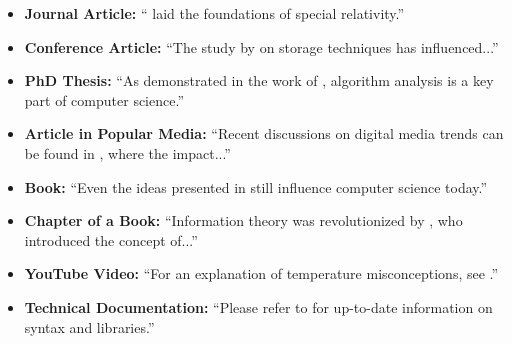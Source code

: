 \documentclass[10pt,twocolumn]{article}
\begin{document}
\begin{itemize}
    \item \textbf{Journal Article:}  
    ``\textcite{einstein1905} laid the foundations of special relativity.''
    
    \item \textbf{Conference Article:}  
    ``The study by \textcite{morris1970} on storage techniques has influenced...''
    
    \item \textbf{PhD Thesis:}  
    ``As demonstrated in the work of \textcite{knuth1968}, algorithm analysis is a key part of computer science.''
    
    \item \textbf{Article in Popular Media:}  
    ``Recent discussions on digital media trends can be found in \cite{monroe2015}, where the impact...''
    
    \item \textbf{Book:}  
    ``Even the ideas presented in \textcite{turing1950} still influence computer science today.''
    
    \item \textbf{Chapter of a Book:}  
    ``Information theory was revolutionized by \cite{shannon1948}, who introduced the concept of...''
    
    \item \textbf{YouTube Video:}  
    ``For an explanation of temperature misconceptions, see \textcite{veritasium2012}.''
    
    \item \textbf{Technical Documentation:}  
    ``Please refer to \cite{python3} for up-to-date information on syntax and libraries.''
\end{itemize}

\printbibliography
\end{document}
